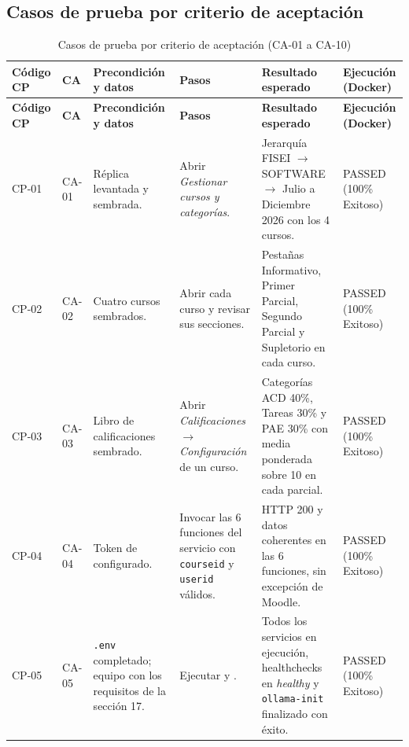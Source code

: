 \documentclass[11pt,a4paper]{article}
\newcommand{\hd}[1]{\textbf{#1}}
\begin{document}
\subsection{Casos de prueba por criterio de aceptación}
\begin{longtable}{|R{1.35cm}|R{1.1cm}|R{2.6cm}|R{3.1cm}|R{3.1cm}|R{1.7cm}|}
\caption{Casos de prueba por criterio de aceptación (CA-01 a CA-10)}\\
\hline \hd{Código CP} & \hd{CA} & \hd{Precondición y datos} & \hd{Pasos} & \hd{Resultado esperado} & \hd{Ejecución (Docker)}\\ \hline \endfirsthead
\hline \hd{Código CP} & \hd{CA} & \hd{Precondición y datos} & \hd{Pasos} & \hd{Resultado esperado} & \hd{Ejecución (Docker)}\\ \hline \endhead
\footnotesize CP-01 & \footnotesize CA-01 & \footnotesize Réplica levantada y sembrada. & \footnotesize Abrir \emph{Gestionar cursos y categorías}. & \footnotesize Jerarquía FISEI $\rightarrow$ SOFTWARE $\rightarrow$ Julio a Diciembre 2026 con los 4 cursos. & \footnotesize PASSED (100\% Exitoso)\\ \hline
\footnotesize CP-02 & \footnotesize CA-02 & \footnotesize Cuatro cursos sembrados. & \footnotesize Abrir cada curso y revisar sus secciones. & \footnotesize Pestañas Informativo, Primer Parcial, Segundo Parcial y Supletorio en cada curso. & \footnotesize PASSED (100\% Exitoso)\\ \hline
\footnotesize CP-03 & \footnotesize CA-03 & \footnotesize Libro de calificaciones sembrado. & \footnotesize Abrir \emph{Calificaciones $\rightarrow$ Configuración} de un curso. & \footnotesize Categorías ACD 40\%, Tareas 30\% y PAE 30\% con media ponderada sobre 10 en cada parcial. & \footnotesize PASSED (100\% Exitoso)\\ \hline
\footnotesize CP-04 & \footnotesize CA-04 & \footnotesize Token de  configurado. & \footnotesize Invocar las 6 funciones del servicio con \texttt{courseid} y \texttt{userid} válidos. & \footnotesize HTTP 200 y datos coherentes en las 6 funciones, sin excepción de Moodle. & \footnotesize PASSED (100\% Exitoso)\\ \hline
\footnotesize CP-05 & \footnotesize CA-05 & \footnotesize \texttt{.env} completado; equipo con los requisitos de la sección 17. & \footnotesize Ejecutar  y . & \footnotesize Todos los servicios en ejecución, healthchecks en \emph{healthy} y \texttt{ollama-init} finalizado con éxito. & \footnotesize PASSED (100\% Exitoso)\\ \hline

\end{longtable}
\end{document}

